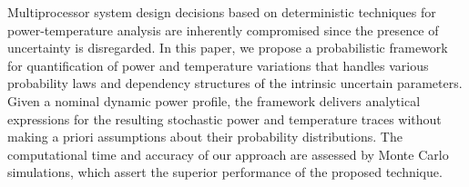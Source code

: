 Multiprocessor system design decisions based on deterministic techniques for power-temperature analysis are inherently compromised since the presence of uncertainty is disregarded. In this paper, we propose a probabilistic framework for quantification of power and temperature variations that handles various probability laws and dependency structures of the intrinsic uncertain parameters. Given a nominal dynamic power profile, the framework delivers analytical expressions for the resulting stochastic power and temperature traces without making a priori assumptions about their probability distributions. The computational time and accuracy of our approach are assessed by Monte Carlo simulations, which assert the superior performance of the proposed technique.
